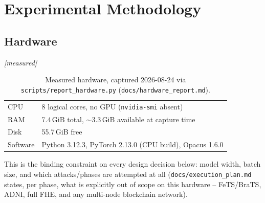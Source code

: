 \documentclass[11pt]{article}
\newcommand{\status}[1]{\textit{[#1]}}
\begin{document}
\section{Experimental Methodology}
\label{sec:methodology}

\subsection{Hardware} \status{measured}
\begin{table}[h]
\centering
\caption{Measured hardware, captured 2026-08-24 via
\texttt{scripts/report\_hardware.py} (\texttt{docs/hardware\_report.md}).}
\label{tab:hardware}
\begin{tabular}{ll}
\toprule
CPU & 8 logical cores, no GPU (\texttt{nvidia-smi} absent) \\
RAM & 7.4\,GiB total, $\sim$3.3\,GiB available at capture time \\
Disk & 55.7\,GiB free \\
Software & Python 3.12.3, PyTorch 2.13.0 (CPU build), Opacus 1.6.0 \\
\bottomrule
\end{tabular}
\end{table}
This is the binding constraint on every design decision below: model width,
batch size, and which attacks/phases are attempted at all
(\texttt{docs/execution\_plan.md} states, per phase, what is explicitly out
of scope on this hardware -- FeTS/BraTS, ADNI, full FHE, and any
multi-node blockchain network).
\end{document}
